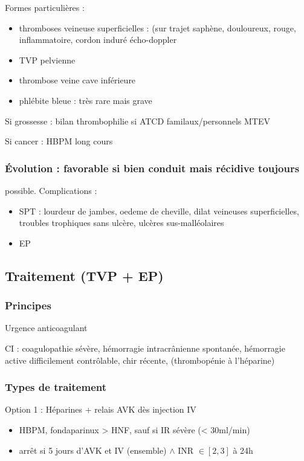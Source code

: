 \documentclass{book}
\begin{document}
Formes particulières :

\begin{itemize}
\item thromboses veineuse superficielles : (sur trajet saphène, douloureux,
rouge, inflammatoire, cordon induré \thus écho-doppler
\item TVP pelvienne
\item thrombose veine cave inférieure
\item phlébite bleue : très rare mais grave
\end{itemize}


Si grossesse : bilan thrombophilie si ATCD familaux/personnels MTEV

Si cancer : HBPM long cours

\subsubsection{Évolution : favorable si bien conduit mais récidive toujours}
\label{sec:orge51f35b}
possible. Complications : 

\begin{itemize}
\item SPT : lourdeur de jambes, oedeme de cheville, dilat veineuses
superficielles, troubles trophiques sans ulcère, ulcères sus-malléolaires
\item EP
\end{itemize}




\subsection{Traitement (TVP + EP)}
\label{sec:orgbacee49}
\subsubsection{Principes}
\label{sec:org9c540d5}
Urgence \faBomb \thus anticoagulant

CI : coagulopathie sévère, hémorragie intracrânienne spontanée, hémorragie
active difficilement contrôlable, chir récente, (thrombopénie à l'héparine)

\subsubsection{Types de traitement}
\label{sec:orga516daa}
Option 1 : Héparines + relais AVK dès injection IV

\begin{itemize}
\item HBPM, fondaparinux > HNF, sauf si IR sévère (< 30ml/min)
\item arrêt si 5 jours d'AVK et IV (ensemble) \(\wedge\) INR \(\in [2,3]\) à 24h
\end{itemize}
\end{document}
